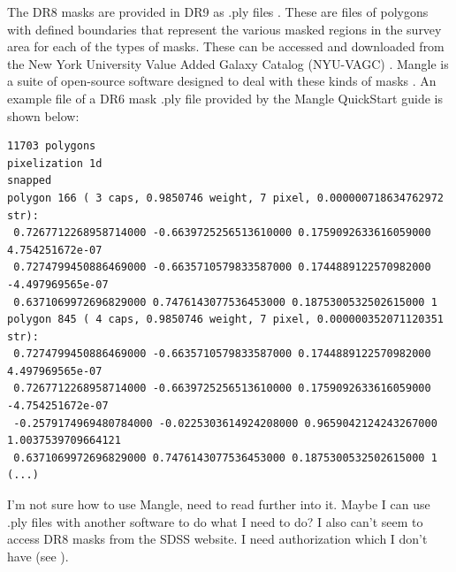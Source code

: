 \documentclass[10pt,letterpaper]{article}
\begin{document}
The DR8 masks are provided in DR9 \cite{image masks} as .ply files \cite{dr9 masks}. These are files of polygons with defined boundaries that represent the various masked regions in the survey area for each of the types of masks. These can be accessed and downloaded from the New York University Value Added Galaxy Catalog (NYU-VAGC) \cite{NYUVAGC}. Mangle is a suite of open-source software designed to deal with these kinds of masks \cite{mangle}. An example file of a DR6 mask .ply file provided by the Mangle QuickStart guide is shown below:\\
\small
\begin{lstlisting}
11703 polygons
pixelization 1d
snapped
polygon 166 ( 3 caps, 0.9850746 weight, 7 pixel, 0.000000718634762972 str):
 0.7267712268958714000 -0.6639725256513610000 0.1759092633616059000 4.754251672e-07
 0.7274799450886469000 -0.6635710579833587000 0.1744889122570982000 -4.497969565e-07
 0.6371069972696829000 0.7476143077536453000 0.1875300532502615000 1
polygon 845 ( 4 caps, 0.9850746 weight, 7 pixel, 0.000000352071120351 str):
 0.7274799450886469000 -0.6635710579833587000 0.1744889122570982000 4.497969565e-07
 0.7267712268958714000 -0.6639725256513610000 0.1759092633616059000 -4.754251672e-07
 -0.2579174969480784000 -0.0225303614924208000 0.9659042124243267000 1.0037539709664121
 0.6371069972696829000 0.7476143077536453000 0.1875300532502615000 1
(...)
\end{lstlisting}
I'm not sure how to use Mangle, need to read further into it. Maybe I can use .ply files with another software to do what I need to do? I also can't seem to access DR8 masks from the SDSS website. I need authorization which I don't have (see \cite{dr9 masks}).\\
\newpage
\end{document}
